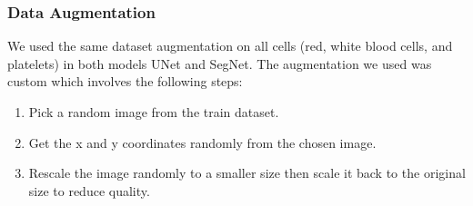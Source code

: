 \documentclass[conference]{IEEEtran}
\begin{document}
\subsubsection{Data Augmentation}
We used the same dataset augmentation on all cells (red, white blood cells, and platelets) in both models UNet and SegNet. The augmentation we used was custom which involves the following steps:
\begin{enumerate}
\item Pick a random image from the train dataset.
\item Get the x and y coordinates randomly from the chosen image.
\item Rescale the image randomly to a smaller size then scale it back to the original size to reduce quality.
\end{enumerate}
\end{document}
